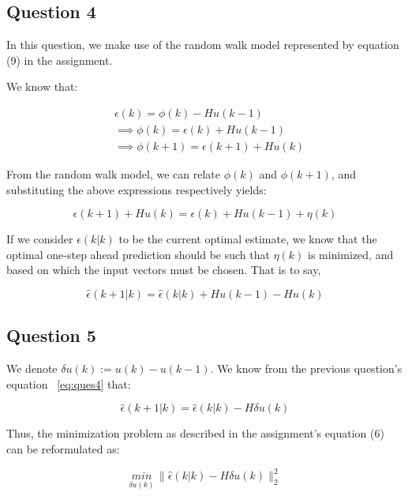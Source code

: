 \documentclass[12pt]{report}
\begin{document}
\subsection*{Question 4}

In this question, we make use of the random walk model represented by equation (9) in the assignment.

We know that:

\begin{equation*}
\begin{aligned}
&\epsilon(k) = \phi(k) - Hu(k-1) \\
&\implies \phi(k) = \epsilon(k) + Hu(k-1) \\
&\implies \phi(k+1) = \epsilon(k+1) + Hu(k)
\end{aligned}
\end{equation*}

From the random walk model, we can relate $\phi(k)$ and $\phi(k+1)$, and substituting the above expressions respectively yields:

\begin{equation*}
\epsilon(k+1) + Hu(k) = \epsilon(k) + Hu(k-1) + \eta(k)
\end{equation*}

If we consider $\hat\epsilon(k|k)$ to be the current optimal estimate, we know that the optimal one-step ahead prediction should be such that $\eta(k)$ is minimized, and based on which the input vectors must be chosen. That is to say,

\begin{equation}\label{eq:ques4}
\hat\epsilon(k+1|k) = \hat\epsilon(k|k) + Hu(k-1) - Hu(k)
\end{equation}

\subsection*{Question 5}

We denote $\delta u(k) := u(k) - u(k-1)$. We know from the previous question's equation ~\ref{eq:ques4} that:

\begin{equation*}
\hat\epsilon(k+1|k) = \hat\epsilon(k|k) - H\delta u(k)
\end{equation*}

Thus, the minimization problem as described in the assignment's equation (6) can be reformulated as:

\begin{equation*}
	\underset{\delta u(k)}{min} \, \|\hat\epsilon(k|k) - H\delta u(k)\|_{2}^{2}
\end{equation*}
\end{document}

